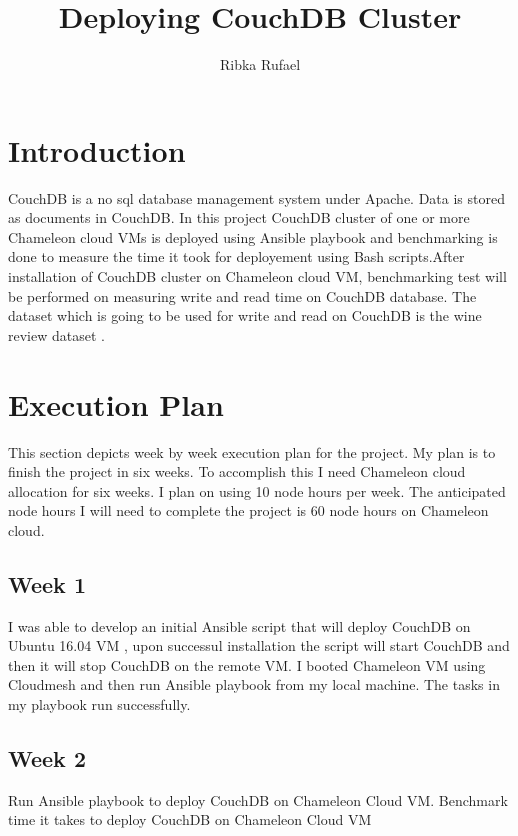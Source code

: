 \documentclass[9pt,twocolumn,twoside]{../../styles/osajnl}
\title{Deploying CouchDB Cluster}
\author[1,*,+]{Ribka Rufael}
\affil[1]{School of Informatics and Computing, Bloomington, IN 47408, U.S.A.}
\affil[*]{Corresponding authors: rrufael@umail.iu.edu}
\affil[+]{HID: S17-IO-3016}
\begin{document}
\maketitle

\section{Introduction}

CouchDB \cite{www-Couchdb} is a no sql database management system
under Apache. Data is stored as documents in CouchDB. In this project
CouchDB cluster of one or more Chameleon cloud VMs is deployed using
Ansible playbook and benchmarking is done to measure the time it took
for deployement using Bash scripts.After installation of CouchDB
cluster on Chameleon cloud VM, benchmarking test will be performed on
measuring write and read time on CouchDB database. The dataset which
is going to be used for write and read on CouchDB is the wine review
dataset \cite{www-WineReview}.

\section{Execution Plan}

This section depicts week by week execution plan for the project. My
plan is to finish the project in six weeks. To accomplish this I need
Chameleon cloud allocation for six weeks. I plan on using 10 node
hours per week. The anticipated node hours I will need to complete
the project is 60 node hours on Chameleon cloud.

\subsection{Week 1}

I was able to develop an initial Ansible script that will deploy
CouchDB on Ubuntu 16.04 VM , upon successul installation the script
will start CouchDB and then it will stop CouchDB on the remote VM. I
booted Chameleon VM using Cloudmesh and then run Ansible playbook from
my local machine. The tasks in my playbook run successfully.

\subsection{Week 2}

Run Ansible playbook to deploy CouchDB on Chameleon Cloud
VM. Benchmark time it takes to deploy CouchDB on Chameleon Cloud VM
\end{document}
